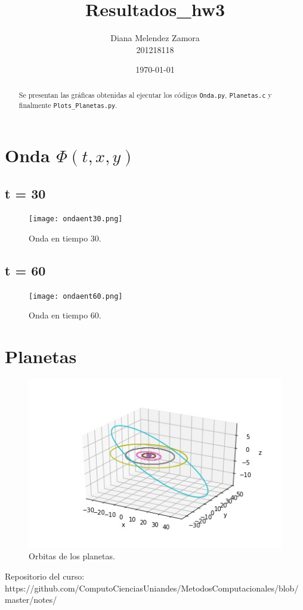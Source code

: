 \documentclass[]{article}
\title{Resultados\_hw3}
\author{Diana Melendez Zamora \\ 201218118}
\date{\today}
\begin{document}
\maketitle

\begin{abstract}
Se presentan las gráficas obtenidas al ejecutar los códigos \texttt{Onda.py}, \texttt{Planetas.c} y finalmente \texttt{Plots\_Planetas.py}.
\end{abstract}


\section{Onda $\Phi (t,x,y)$}
\subsection{t = 30}
\begin{figure}[H]
	\centering
	\texttt{[image: ondaent30.png]}
	\caption{{\small Onda en tiempo 30.}}
	\label{fig: ondaent30}
\end{figure}


\subsection{t = 60}
\begin{figure}[H]
	\centering
	\texttt{[image: ondaent60.png]}
	\caption{{\small Onda en tiempo 60.}}
	\label{fig: ondaent60}
\end{figure}



\section{Planetas}
\begin{figure}[H]
	\centering
	\includegraphics[scale=0.7]{orbitasdelosplanetas.jpg}
	\caption{{\small Orbitas de los planetas.}}
	\label{fig: orbitasdelosplanetas.png}
\end{figure}





\begin{thebibliography}{9}	
	
	Repositorio del curso: \\ https://github.com/ComputoCienciasUniandes/MetodosComputacionales/blob/master/notes/

\end{thebibliography}
\end{document}
